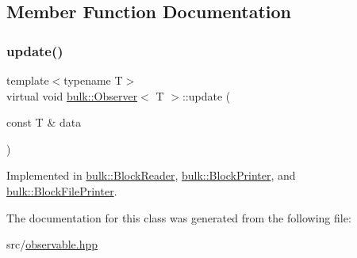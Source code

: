 \subsection{Member Function Documentation}
\mbox{\label{classbulk_1_1Observer_af17104660bf8b287e467213c4efbee2e}} 
\subsubsection{\texorpdfstring{update()}{update()}}
{\footnotesize\ttfamily template$<$typename T$>$ \\
virtual void \hyperlink{classbulk_1_1Observer}{bulk\+::\+Observer}$<$ T $>$\+::update (\begin{DoxyParamCaption}\item[{const T \&}]{data }\end{DoxyParamCaption})\hspace{0.3cm}{\ttfamily [pure virtual]}}



Implemented in \hyperlink{classbulk_1_1BlockReader_a0a3b9ff69552b233b037afcd7e858ef1}{bulk\+::\+Block\+Reader}, \hyperlink{classbulk_1_1BlockPrinter_a9f961b39d2c0bf9112524bf6773bb3e1}{bulk\+::\+Block\+Printer}, and \hyperlink{classbulk_1_1BlockFilePrinter_a3e8a6eaf52ef8bef0fa9ec0b298c7382}{bulk\+::\+Block\+File\+Printer}.



The documentation for this class was generated from the following file\+:\begin{DoxyCompactItemize}
\item 
src/\hyperlink{observable_8hpp}{observable.\+hpp}\end{DoxyCompactItemize}
